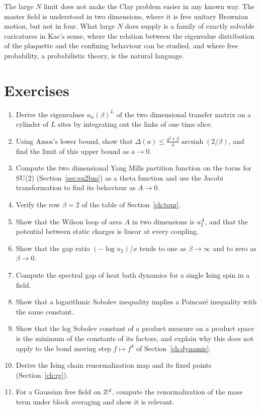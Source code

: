 The large $N$ limit does not make the Clay problem easier in any known way. The master field is understood in two dimensions, where it is free unitary Brownian motion, but not in four. What large $N$ does supply is a family of exactly solvable caricatures in Kac's sense, where the relation between the eigenvalue distribution of the plaquette and the confining behaviour can be studied, and where free probability, a probabilistic theory, is the natural language.

\section*{Exercises}
\begin{enumerate}
\item Derive the eigenvalues $u_n(\beta)^L$ of the two dimensional transfer matrix on a cylinder of $L$ sites by integrating out the links of one time slice.
\item Using Amos's lower bound, show that $\Delta(a)\le\frac{g^2\ell\beta}{4}\operatorname{arcsinh}(2/\beta)$, and find the limit of this upper bound as $a\to0$.
\item Compute the two dimensional Yang Mills partition function on the torus for SU(2) (Section~\ref{sec:su2bm}) as a theta function and use the Jacobi transformation to find its behaviour as $A\to0$.
\item Verify the row $\beta=2$ of the table of Section~\ref{ch:tour}.
\item Show that the Wilson loop of area $A$ in two dimensions is $u_2^A$, and that the potential between static charges is linear at every coupling.
\item Show that the gap ratio $(-\log u_2)/x$ tends to one as $\beta\to\infty$ and to zero as $\beta\to0$.
\item Compute the spectral gap of heat bath dynamics for a single Ising spin in a field.
\item Show that a logarithmic Sobolev inequality implies a Poincar\'e inequality with the same constant.
\item Show that the log Sobolev constant of a product measure on a product space is the minimum of the constants of its factors, and explain why this does not apply to the bond moving step $f\mapsto f^4$ of Section~\ref{ch:dynamic}.
\item Derive the Ising chain renormalization map and its fixed points (Section~\ref{ch:rg}).
\item For a Gaussian free field on $\mathbb{Z}^d$, compute the renormalization of the mass term under block averaging and show it is relevant.

\end{enumerate}
